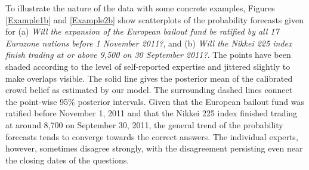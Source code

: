 \documentclass[aoas, preprint]{imsart}
\numberwithin{equation}{section}
\theoremstyle{plain}
\begin{document}
To illustrate the nature of the data with some concrete examples, Figures \ref{Example1b} and \ref{Example2b} show scatterplots of the probability forecasts given for (a) \textit{Will the expansion of the European bailout fund be ratified by all 17 Eurozone nations before 1 November 2011?}, and (b) \textit{Will the Nikkei 225 index finish trading at or above 9,500 on 30 September 2011?}. The points have been shaded according to the level of self-reported expertise and jittered slightly to make overlaps visible. The solid line gives the posterior mean of the calibrated crowd belief as estimated by our model. The surrounding dashed lines connect the point-wise 95\% posterior intervals. Given that the European bailout fund was ratified before November 1, 2011 and that the Nikkei 225 index finished trading at around 8,700 on September 30, 2011, the general trend of the probability forecasts tends to converge towards the correct answers. The individual experts, however, sometimes disagree strongly, with the disagreement persisting even near the closing dates of the questions. 
\end{document}
